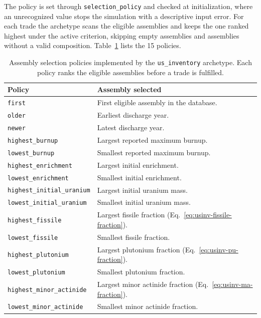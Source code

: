 The policy is set through \texttt{selection\_policy} and checked at
initialization, where an unrecognized value stops the simulation with a
descriptive input error. For each trade the archetype scans the eligible assemblies and
keeps the one ranked highest under the active criterion, skipping empty assemblies and
assemblies without a valid composition. Table~\ref{tab:usinv-selection-policies} lists
the 15 policies.

\begin{table}[h!]
    \centering
    \caption{Assembly selection policies implemented by the
    \texttt{us\_inventory} archetype. Each policy ranks the eligible
    assemblies before a trade is fulfilled.}
    \label{tab:usinv-selection-policies}
    \begin{tabular}{p{} p{}}
        \hline
        \textbf{Policy} & \textbf{Assembly selected} \\
        \hline
        \texttt{first}                    & First eligible assembly in the database. \\
        \texttt{older}                    & Earliest discharge year. \\
        \texttt{newer}                    & Latest discharge year. \\
        \texttt{highest\_burnup}          & Largest reported maximum burnup. \\
        \texttt{lowest\_burnup}           & Smallest reported maximum burnup. \\
        \texttt{highest\_enrichment}      & Largest initial enrichment. \\
        \texttt{lowest\_enrichment}       & Smallest initial enrichment. \\
        \texttt{highest\_initial\_uranium}& Largest initial uranium mass. \\
        \texttt{lowest\_initial\_uranium} & Smallest initial uranium mass. \\
        \texttt{highest\_fissile}         & Largest fissile fraction
        (Eq.~\ref{eq:usinv-fissile-fraction}). \\
        \texttt{lowest\_fissile}          & Smallest fissile fraction. \\
        \texttt{highest\_plutonium}       & Largest plutonium fraction
        (Eq.~\ref{eq:usinv-pu-fraction}). \\
        \texttt{lowest\_plutonium}        & Smallest plutonium fraction. \\
        \texttt{highest\_minor\_actinide} & Largest minor actinide fraction
        (Eq.~\ref{eq:usinv-ma-fraction}). \\
        \texttt{lowest\_minor\_actinide}  & Smallest minor actinide fraction. \\
        \hline
    \end{tabular}
\end{table}

